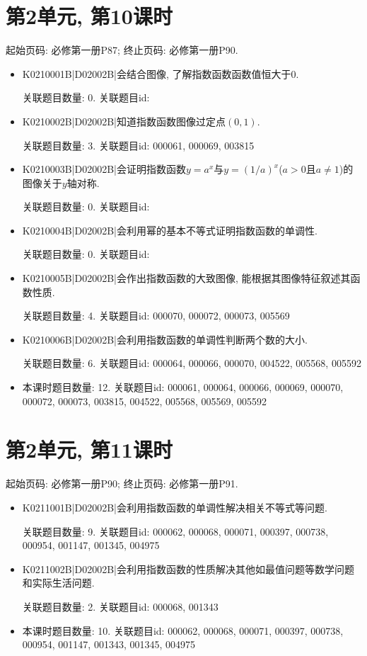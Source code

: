 \section*{第2单元, 第10课时}
起始页码: 必修第一册P87; 终止页码: 必修第一册P90.
\begin{itemize}
\item K0210001B|D02002B|会结合图像, 了解指数函数函数值恒大于$0$.

关联题目数量: 0. 关联题目id: 

\item K0210002B|D02002B|知道指数函数图像过定点$(0,1)$.

关联题目数量: 3. 关联题目id: 000061, 000069, 003815

\item K0210003B|D02002B|会证明指数函数$y=a^{x}$与$y=(1/a)^{x}$($a>0$且$a\neq1$)的图像关于$y$轴对称.

关联题目数量: 0. 关联题目id: 

\item K0210004B|D02002B|会利用幂的基本不等式证明指数函数的单调性.

关联题目数量: 0. 关联题目id: 

\item K0210005B|D02002B|会作出指数函数的大致图像, 能根据其图像特征叙述其函数性质.

关联题目数量: 4. 关联题目id: 000070, 000072, 000073, 005569

\item K0210006B|D02002B|会利用指数函数的单调性判断两个数的大小.

关联题目数量: 6. 关联题目id: 000064, 000066, 000070, 004522, 005568, 005592

\item 本课时题目数量: 12. 关联题目id: 000061, 000064, 000066, 000069, 000070, 000072, 000073, 003815, 004522, 005568, 005569, 005592

\end{itemize}

\section*{第2单元, 第11课时}
起始页码: 必修第一册P90; 终止页码: 必修第一册P91.
\begin{itemize}
\item K0211001B|D02002B|会利用指数函数的单调性解决相关不等式等问题.

关联题目数量: 9. 关联题目id: 000062, 000068, 000071, 000397, 000738, 000954, 001147, 001345, 004975

\item K0211002B|D02002B|会利用指数函数的性质解决其他如最值问题等数学问题和实际生活问题.

关联题目数量: 2. 关联题目id: 000068, 001343

\item 本课时题目数量: 10. 关联题目id: 000062, 000068, 000071, 000397, 000738, 000954, 001147, 001343, 001345, 004975

\end{itemize}


